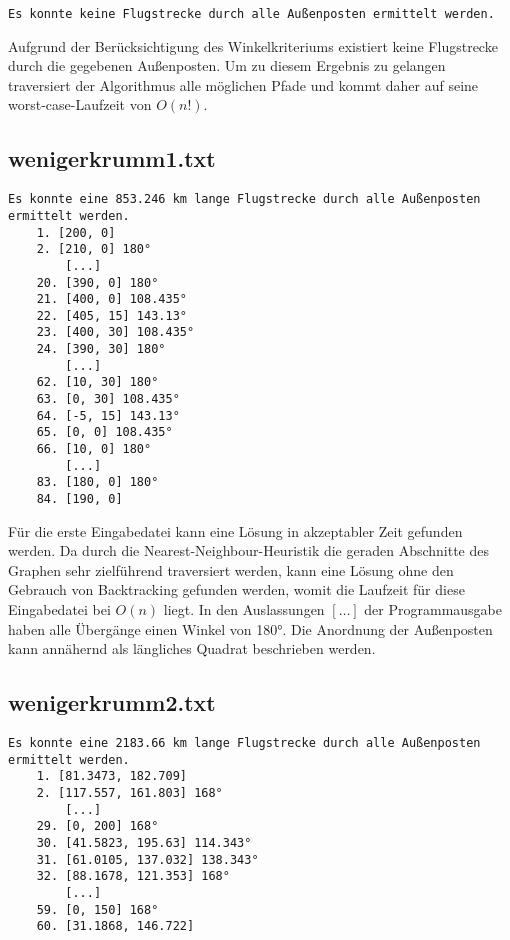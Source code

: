 \documentclass[a4paper,10pt,ngerman]{scrartcl}
\begin{document}
    \begin{lstlisting}[frame=single, title=Programmausgabe nicht\_loesbar.txt, breaklines=true,label={lst:lstlisting4}]
    Es konnte keine Flugstrecke durch alle Außenposten ermittelt werden.
    \end{lstlisting}

    Aufgrund der Berücksichtigung des Winkelkriteriums existiert keine Flugstrecke durch die gegebenen Außenposten.
    Um zu diesem Ergebnis zu gelangen traversiert der Algorithmus alle möglichen Pfade und kommt daher auf seine
    worst-case-Laufzeit von $O(n!)$.

    \subsection{wenigerkrumm1.txt}\label{subsec:wenigerkrumm1.txt}

    \begin{lstlisting}[frame=single, title=Programmausgabe wenigerkrumm1.txt, breaklines=true,label={lst:lstlisting4}]
    Es konnte eine 853.246 km lange Flugstrecke durch alle Außenposten ermittelt werden.
    1. [200, 0]
    2. [210, 0] 180°
        [...]
    20. [390, 0] 180°
    21. [400, 0] 108.435°
    22. [405, 15] 143.13°
    23. [400, 30] 108.435°
    24. [390, 30] 180°
        [...]
    62. [10, 30] 180°
    63. [0, 30] 108.435°
    64. [-5, 15] 143.13°
    65. [0, 0] 108.435°
    66. [10, 0] 180°
        [...]
    83. [180, 0] 180°
    84. [190, 0]
    \end{lstlisting}

    Für die erste Eingabedatei kann eine Lösung in akzeptabler Zeit gefunden werden.
    Da durch die Nearest-Neighbour-Heuristik die geraden Abschnitte des Graphen sehr zielführend traversiert werden,
    kann eine Lösung ohne den Gebrauch von Backtracking gefunden werden, womit die Laufzeit für diese Eingabedatei bei $O(n)$ liegt.
    In den Auslassungen $[\dots]$ der Programmausgabe haben alle Übergänge einen Winkel von 180°.
    Die Anordnung der Außenposten kann annähernd als längliches Quadrat beschrieben werden.

    \subsection{wenigerkrumm2.txt}\label{subsec:wenigerkrumm2.txt}

    \begin{lstlisting}[frame=single, title=Programmausgabe wenigerkrumm2.txt, breaklines=true,label={lst:lstlisting4}]
    Es konnte eine 2183.66 km lange Flugstrecke durch alle Außenposten ermittelt werden.
    1. [81.3473, 182.709]
    2. [117.557, 161.803] 168°
        [...]
    29. [0, 200] 168°
    30. [41.5823, 195.63] 114.343°
    31. [61.0105, 137.032] 138.343°
    32. [88.1678, 121.353] 168°
        [...]
    59. [0, 150] 168°
    60. [31.1868, 146.722]
    \end{lstlisting}
\end{document}
